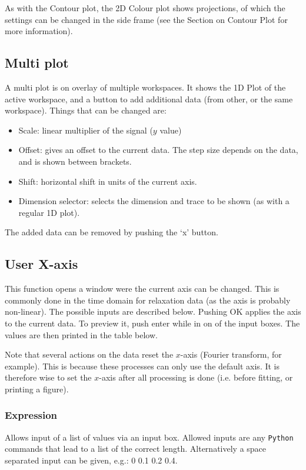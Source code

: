 \documentclass[11pt,a4paper]{article}
\begin{document}
As with the Contour plot, the 2D Colour plot shows projections, of which the settings can be changed in the side frame (see the Section on Contour Plot for more information).

\subsection{Multi plot}
A multi plot is on overlay of multiple workspaces. It shows the 1D Plot of the active workspace, and a button
to add additional data (from other, or the same workspace). Things that can be changed are:
\begin{itemize}
  \item Scale: linear multiplier of the signal ($y$ value)
  \item Offset: gives an offset to the current data. The step size depends on the data, and is shown between
	 brackets.
  \item Shift: horizontal shift in units of the current axis.
  \item Dimension selector: selects the dimension and trace to be shown (as with a regular 1D plot).
\end{itemize}
The added data can be removed by pushing the `x' button.


\subsection{User X-axis}
This function opens a window were the current axis can be changed. This is commonly done in the time domain
for relaxation data (as the axis is probably non-linear). The possible inputs are described below. Pushing OK
applies the axis to the current data. To preview it, push enter while in on of the input boxes. The values are
then printed in the table below.

Note that several actions on the data reset the $x$-axis (Fourier transform, for example). This is because
these processes can only use the default axis. It is therefore wise to set the $x$-axis after all processing is
done (i.e. before fitting, or printing a figure).

\subsubsection{Expression}
Allows input of a list of values via an input box. Allowed inputs are any \texttt{Python} commands that lead
to a list of the correct length. Alternatively a space separated input can be given, e.g.: 0 0.1 0.2 0.4.
\end{document}
